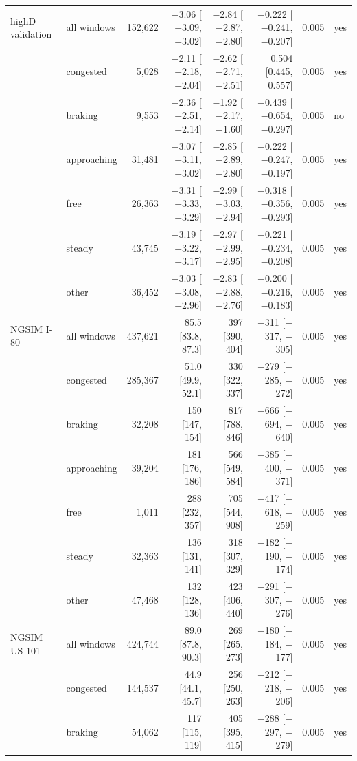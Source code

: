 \begin{longtable}{llrrrrrl}
highD validation & all windows & 152,622 & $-$3.06 [$-$3.09, $-$3.02] & $-$2.84 [$-$2.87, $-$2.80] & $-$0.222 [$-$0.241, $-$0.207] & 0.005 & yes \\
 & congested & 5,028 & $-$2.11 [$-$2.18, $-$2.04] & $-$2.62 [$-$2.71, $-$2.51] & 0.504 [0.445, 0.557] & 0.005 & yes \\
 & braking & 9,553 & $-$2.36 [$-$2.51, $-$2.14] & $-$1.92 [$-$2.17, $-$1.60] & $-$0.439 [$-$0.654, $-$0.297] & 0.005 & no \\
 & approaching & 31,481 & $-$3.07 [$-$3.11, $-$3.02] & $-$2.85 [$-$2.89, $-$2.80] & $-$0.222 [$-$0.247, $-$0.197] & 0.005 & yes \\
 & free & 26,363 & $-$3.31 [$-$3.33, $-$3.29] & $-$2.99 [$-$3.03, $-$2.94] & $-$0.318 [$-$0.356, $-$0.293] & 0.005 & yes \\
 & steady & 43,745 & $-$3.19 [$-$3.22, $-$3.17] & $-$2.97 [$-$2.99, $-$2.95] & $-$0.221 [$-$0.234, $-$0.208] & 0.005 & yes \\
 & other & 36,452 & $-$3.03 [$-$3.08, $-$2.96] & $-$2.83 [$-$2.88, $-$2.76] & $-$0.200 [$-$0.216, $-$0.183] & 0.005 & yes \\
\midrule
NGSIM I-80 & all windows & 437,621 & 85.5 [83.8, 87.3] & 397 [390, 404] & $-$311 [$-$317, $-$305] & 0.005 & yes \\
 & congested & 285,367 & 51.0 [49.9, 52.1] & 330 [322, 337] & $-$279 [$-$285, $-$272] & 0.005 & yes \\
 & braking & 32,208 & 150 [147, 154] & 817 [788, 846] & $-$666 [$-$694, $-$640] & 0.005 & yes \\
 & approaching & 39,204 & 181 [176, 186] & 566 [549, 584] & $-$385 [$-$400, $-$371] & 0.005 & yes \\
 & free & 1,011 & 288 [232, 357] & 705 [544, 908] & $-$417 [$-$618, $-$259] & 0.005 & yes \\
 & steady & 32,363 & 136 [131, 141] & 318 [307, 329] & $-$182 [$-$190, $-$174] & 0.005 & yes \\
 & other & 47,468 & 132 [128, 136] & 423 [406, 440] & $-$291 [$-$307, $-$276] & 0.005 & yes \\
\midrule
NGSIM US-101 & all windows & 424,744 & 89.0 [87.8, 90.3] & 269 [265, 273] & $-$180 [$-$184, $-$177] & 0.005 & yes \\
 & congested & 144,537 & 44.9 [44.1, 45.7] & 256 [250, 263] & $-$212 [$-$218, $-$206] & 0.005 & yes \\
 & braking & 54,062 & 117 [115, 119] & 405 [395, 415] & $-$288 [$-$297, $-$279] & 0.005 & yes \\

\end{longtable}
